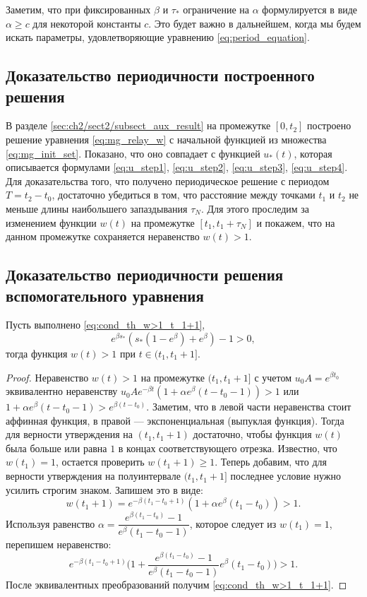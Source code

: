 Заметим, что при фиксированных $\beta$ и $\tau_*$ ограничение на $\alpha$ формулируется в виде $\alpha \geq c$ для некоторой константы $c$. Это будет важно в дальнейшем, когда мы будем искать параметры, удовлетворяющие уравнению \eqref{eq:period_equation}.


\subsection{Доказательство периодичности построенного решения}
В разделе \ref{sec:ch2/sect2/subsect_aux_result} на промежутке $[0,t_2]$ построено решение уравнения \eqref{eq:mg_relay_w} с начальной функцией из множества \eqref{eq:mg_init_set}. Показано, что оно совпадает с функцией $u_*(t)$, которая описывается формулами \eqref{eq:u_step1}, \eqref{eq:u_step2}, \eqref{eq:u_step3}, \eqref{eq:u_step4}. Для доказательства того, что получено периодическое решение с периодом $T = t_2 - t_0$, достаточно убедиться в том, что расстояние между точками $t_1$ и $t_2$ не меньше длины наибольшего запаздывания $\tau_N$. Для этого проследим за изменением функции $w(t)$ на промежутке $[t_1,t_1+\tau_N]$ и покажем, что на данном промежутке сохраняется неравенство $w(t) > 1$.

\subsection{Доказательство периодичности решения вспомогательного уравнения}

\begin{proposition}
	\label{w>1_t_1-t_1+1} Пусть выполнено \eqref{eq:cond_th_w>1_t_1+1},
	\begin{equation}
		\label{w>1_t_1+1}
		e^{\beta s_*}\left(s_*(1-e^\beta) + e^\beta \right) - 1 > 0,
	\end{equation}
	тогда функция $w(t)>1$ при $t\in (t_1, t_1 + 1]$.
\end{proposition}
\begin{proof}
	Неравенство $w(t)>1$ на промежутке $(t_1, t_1 + 1]$ с учетом $u_0 A = e^{\beta t_0}$ эквивалентно неравенству $u_0Ae^{-\beta t}(1+\alpha e^{\beta }(t-t_0-1)) >1$ или $1+\alpha e^{\beta }(t-t_0-1) > e^{\beta (t-t_0)}$.
	Заметим, что в левой части неравенства стоит аффинная функция, в правой --- экспоненциальная (выпуклая функция). Тогда для верности утверждения на $(t_1, t_1 + 1)$ достаточно, чтобы функция $w(t)$ была больше или равна $1$ в концах соответствующего отрезка. Известно, что $w(t_1) = 1$, остается проверить $w(t_1+1) \geqslant 1$. Теперь добавим, что для верности утверждения на полуинтервале $(t_1, t_1 + 1]$ последнее условие нужно усилить строгим знаком.
	Запишем это в виде:
	$$w(t_1+1) = e^{-\beta (t_1 -t_0+ 1)}( 1+\alpha e^{\beta }(t_1-t_0) )>1 .$$
	Используя равенство $\alpha = \dfrac{e^{\beta(t_1 - t_0)}-1}{e^\beta(t_1 - t_0 -1)}$, которое следует из $w(t_1)=1$, перепишем неравенство:
	$$e^{-\beta(t_1-t_0+1)}\Big(1 + \dfrac{e^{\beta(t_1 - t_0)}-1}{e^\beta(t_1 - t_0 -1)}e^\beta(t_1 - t_0) \Big)>1.$$
	После эквивалентных преобразований получим \eqref{eq:cond_th_w>1_t_1+1}.
\end{proof}

